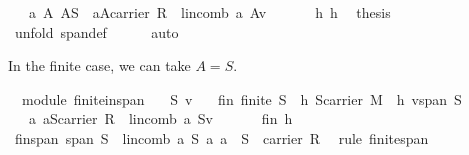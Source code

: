 \begin{isabellebody}
\ \ \ {\isachardoublequoteopen}{\isasymexists}a\ A{\isachardot}\ {\isacharparenleft}A{\isasymsubseteq}S\ {\isasymand}\ {\isacharparenleft}a{\isasymin}A{\isasymrightarrow}carrier\ R{\isacharparenright}\ {\isasymand}\ {\isacharparenleft}lincomb\ a\ A{\isacharequal}v{\isacharparenright}{\isacharparenright}{\isachardoublequoteclose}\isanewline
%
\isadelimproof
%
\endisadelimproof
%
\isatagproof
{}\isamarkupfalse%
\ {\isacharminus}\ \isanewline
\ \ \isamarkupfalse%
\ h{}\ h{}\ \isamarkupfalse%
\ {\isacharquery}thesis\isanewline
\ \ \ \ \isamarkupfalse%
\ {\isacharparenleft}unfold\ span{\isacharunderscore}def{\isacharparenright}\isanewline
\ \ \ \ \isamarkupfalse%
\ auto\isanewline
{}\isamarkupfalse%
%
\endisatagproof
{\isafoldproof}%
%
\isadelimproof
%
\endisadelimproof
%
\begin{isamarkuptext}%
In the finite case, we can take $A=S$.%
\end{isamarkuptext}%
\isamarkuptrue%
\isamarkupfalse%
\ {\isacharparenleft}\ module{\isacharparenright}\ finite{\isacharunderscore}in{\isacharunderscore}span{\isacharcolon}\isanewline
\ \ \ S\ v\isanewline
\ \ \ fin{\isacharcolon}\ {\isachardoublequoteopen}finite\ S{\isachardoublequoteclose}\ \ h{}{\isacharcolon}\ {\isachardoublequoteopen}S{\isasymsubseteq}carrier\ M{\isachardoublequoteclose}\ \ h{}{\isacharcolon}\ {\isachardoublequoteopen}v{\isasymin}span\ S{\isachardoublequoteclose}\isanewline
\ \ \ {\isachardoublequoteopen}{\isasymexists}a{\isachardot}\ {\isacharparenleft}a{\isasymin}S{\isasymrightarrow}carrier\ R{\isacharparenright}\ {\isasymand}\ {\isacharparenleft}lincomb\ a\ S{\isacharequal}v{\isacharparenright}{\isachardoublequoteclose}\isanewline
%
\isadelimproof
%
\endisadelimproof
%
\isatagproof
{}\isamarkupfalse%
\ {\isacharminus}\ \isanewline
\ \ \isamarkupfalse%
\ fin\ h{}\ \isamarkupfalse%
\ fin{\isacharunderscore}span{\isacharcolon}\ {\isachardoublequoteopen}span\ S\ {\isacharequal}\ {\isacharbraceleft}lincomb\ a\ S\ {\isacharbar}a{\isachardot}\ a\ {\isasymin}\ S\ {\isasymrightarrow}\ carrier\ R{\isacharbraceright}{\isachardoublequoteclose}\ \isamarkupfalse%
\ {\isacharparenleft}rule\ finite{\isacharunderscore}span{\isacharparenright}\isanewline
\ \ \isamarkupfalse%

\end{isabellebody}
